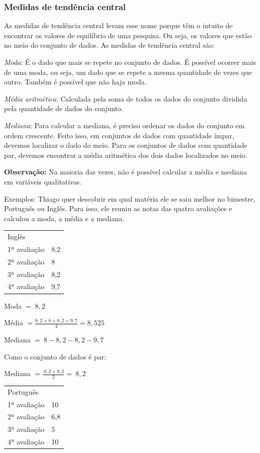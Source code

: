 {\subsubsection{Medidas de tendência central}

As medidas de tendência central levam esse nome porque têm o intuito de
encontrar os valores de equilíbrio de uma pesquisa. Ou seja, os valores
que estão no meio do conjunto de dados. As medidas de tendência central
são:

\medskip \noindent \textit{Moda}: É o dado que mais se repete no conjunto de dados. É possível
ocorrer mais de uma moda, ou seja, um dado que se repete a mesma
quantidade de vezes que outro. Também é possível que não haja moda.

\medskip \noindent \textit{Média aritmética}: Calculada pela soma de todos os dados do conjunto
dividida pela quantidade de dados do conjunto.

\medskip \noindent \textit{Mediana}: Para calcular a mediana, é preciso ordenar os dados do conjunto
em ordem crescente. Feito isso, em conjuntos de dados com quantidade
ímpar, devemos localizar o dado do meio. Para os conjuntos de dados com
quantidade par, devemos encontrar a média aritmética dos dois dados
localizados no meio.

\medskip  \noindent \textbf{Observação:} Na maioria das vezes, não é possível calcular a média e mediana em
variáveis qualitativas.

Exemplos: Thiago quer descobrir em qual matéria ele se saiu melhor no
bimestre, Português ou Inglês. Para isso, ele reuniu as notas das quatro
avaliações e calculou a moda, a média e a mediana.

\begin{longtable}[]{@{}ll@{}}
\toprule
\endhead
Inglês &\tabularnewline
1ª avaliação & 8,2\tabularnewline
2ª avaliação & 8\tabularnewline
3ª avaliação & 8,2\tabularnewline
4ª avaliação & 9,7\tabularnewline
\bottomrule
\end{longtable}


Moda $= \ 8,2$

Média $= \frac{8,2 + 8 + 8,2 + 9,7}{4} = 8,525$

Mediana $= \ 8  - 8,2  - 8,2  - 9,7\ $ 

Como o conjunto de dados é par:

Mediana $ = \frac{\ 8,2 + 8,2}{2} = \ 8,2$

\begin{longtable}[]{@{}ll@{}}
\toprule
\endhead
Português~ &\tabularnewline
1ª avaliação & 10\tabularnewline
2ª avaliação & 6,8\tabularnewline
3ª avaliação & 5\tabularnewline
4ª avaliação & 10\tabularnewline
\bottomrule
\end{longtable}


}
